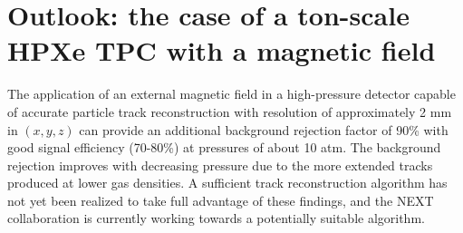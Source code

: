 \documentclass{JINST}
\begin{document}
\section{Outlook: the case of a ton-scale HPXe TPC with a magnetic field}\label{sec.outlook}


The application of an external magnetic field in a high-pressure detector capable of accurate particle track reconstruction with resolution of approximately 2 mm in $(x,y,z)$ can provide an additional background rejection factor of 90\% with good signal efficiency (70-80\%) at pressures of about 10 atm.  The background rejection improves with decreasing pressure due to the more extended tracks produced at lower gas densities.  A sufficient track reconstruction algorithm has not yet been realized to take full advantage of these findings, and the NEXT collaboration is currently working towards a potentially suitable algorithm.
\end{document}
